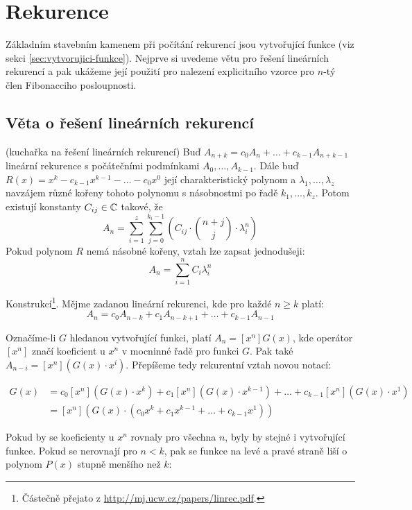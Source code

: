 \section{Rekurence}
\label{sec:rekurence}

Základním stavebním kamenem při počítání rekurencí jsou vytvořující funkce (viz
sekci \ref{sec:vytvorujici-funkce}). Nejprve si uvedeme větu pro řešení lineárních rekurencí a pak ukážeme její použití pro nalezení explicitního vzorce pro $n$-tý člen Fibonacciho posloupnosti.

\subsection{Věta o řešení lineárních rekurencí}

\vt (kuchařka na řešení lineárních rekurencí) Buď $A_{n+k} = c_0A_n + \dots + c_{k-1}A_{n+k-1}$ lineární rekurence s počátečními podmínkami $A_0,\dots,A_{k-1}$. Dále buď $R(x) = x^k - c_{k-1}x^{k-1} - \dots - c_0x^0$ její charakteristický polynom a $\lambda_1,\dots,\lambda_z$ navzájem různé kořeny tohoto polynomu s násobnostmi po řadě $k_1,\dots,k_z$. Potom existují konstanty $C_{ij} \in \mathbb{C}$ takové, že
$$A_n = \sum_{i=1}^z\sum_{j=0}^{k_i-1}\left(C_{ij}\cdot{n+j\choose j}\cdot\lambda_i^n\right)$$
Pokud polynom $R$ nemá násobné kořeny, vztah lze zapsat jednodušeji:
$$A_n = \sum_{i=1}^nC_i\lambda_i^n$$

\dk Konstrukcí\footnote{Částečně přejato z \url{http://mj.ucw.cz/papers/linrec.pdf}.}. Mějme zadanou lineární rekurenci, kde pro každé $n\ge k$ platí:
$$A_n = c_0A_{n-k} + c_1A_{n-k+1} + \dots + c_{k-1}A_{n-1}$$

Označíme-li $G$ hledanou vytvořující funkci, platí $A_n = [x^n]G(x)$, kde operátor $[x^n]$ značí koeficient u $x^n$ v mocninné řadě pro funkci $G$. Pak také $A_{n-i} = [x^n](G(x)\cdot x^i)$. Přepíšeme tedy rekurentní vztah novou notací:

\begin{align}
[x^n]G(x) &= c_0[x^n](G(x)\cdot x^k) + c_1[x^n](G(x)\cdot x^{k-1}) + \dots + c_{k-1}[x^n](G(x)\cdot x^1) \\
&= [x^n]\left(G(x)\cdot (c_0x^k + c_1x^{k-1} + \dots + c_{k-1}x^1)\right)\end{align}

Pokud by se koeficienty u $x^n$ rovnaly pro všechna $n$, byly by stejné i vytvořující funkce. Pokud se nerovnají pro $n<k$, pak se funkce na levé a pravé straně liší o polynom $P(x)$ stupně menšího než $k$:

